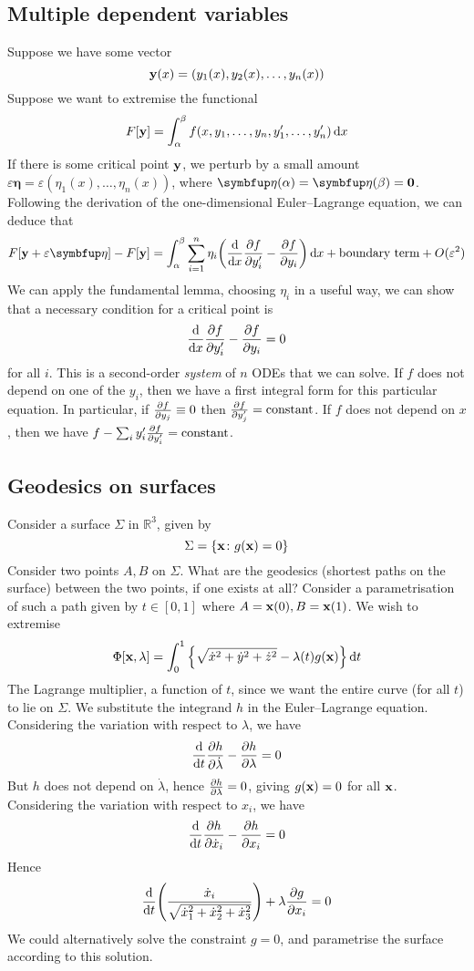 \subsection{Multiple dependent variables}
Suppose we have some vector
\[
	\vb y(x) = (y_1(x), y_2(x), \dots, y_n(x))
\]
Suppose we want to extremise the functional
\[
	F[\vb y] = \int_\alpha^\beta f(x, y_1, \dots, y_n, y'_1, \dots, y'_n) \dd{x}
\]
If there is some critical point \( \vb y \), we perturb by a small amount \( \varepsilon\bm \eta = \varepsilon(\eta_1(x), \dots, \eta_n(x)) \), where \( \bm\eta(\alpha) = \bm\eta(\beta) = \vb 0 \).
Following the derivation of the one-dimensional Euler--Lagrange equation, we can deduce that
\[
	F[\vb y + \varepsilon \bm \eta] - F[\vb y] = \int_\alpha^\beta \sum_{i=1}^n \eta_i \qty(\dv{x}\pdv{f}{y_i'} - \pdv{f}{y_i})\dd{x} + \text{boundary term} + O(\varepsilon^2)
\]
We can apply the fundamental lemma, choosing \( \eta_i \) in a useful way, we can show that a necessary condition for a critical point is
\[
	\dv{x}\pdv{f}{y_i'} - \pdv{f}{y_i} = 0
\]
for all \( i \).
This is a second-order \textit{system} of \( n \) ODEs that we can solve.
If \( f \) does not depend on one of the \( y_i \), then we have a first integral form for this particular equation.
In particular, if \( \pdv{f}{y_j} \equiv 0 \) then \( \pdv{f}{y_j'} = \text{constant} \).
If \( f \) does not depend on \( x \), then we have \( f - \sum_i y_i' \pdv{f}{y_i'} = \text{constant} \).

\subsection{Geodesics on surfaces}
Consider a surface \( \Sigma \) in \( \mathbb R^3 \), given by
\[
	\Sigma = \qty{ \vb x \colon g(\vb x) = 0 }
\]
Consider two points \( A, B \) on \( \Sigma \).
What are the geodesics (shortest paths on the surface) between the two points, if one exists at all?
Consider a parametrisation of such a path given by \( t \in [0, 1] \) where \( A = \vb x(0), B = \vb x(1) \).
We wish to extremise
\[
	\Phi[\vb x, \lambda] = \int_0^1 \qty{ \sqrt{\dot x^2 + \dot y^2 + \dot z^2} - \lambda(t) g(\vb x) } \dd{t}
\]
The Lagrange multiplier, a function of \( t \), since we want the entire curve (for all \( t \)) to lie on \( \Sigma \).
We substitute the integrand \( h \) in the Euler--Lagrange equation.
Considering the variation with respect to \( \lambda \), we have
\[
	\dv{t} \pdv{h}{\dot\lambda} - \pdv{h}{\lambda} = 0
\]
But \( h \) does not depend on \( \dot\lambda \), hence \( \pdv{h}{\lambda} = 0 \), giving \( g(\vb x) = 0 \) for all \( \vb x \).
Considering the variation with respect to \( x_i \), we have
\[
	\dv{t} \pdv{h}{\dot x_i} - \pdv{h}{x_i} = 0
\]
Hence
\[
	\dv{t}\qty(\frac{\dot x_i}{\sqrt{\dot x_1^2 + \dot x_2^2 + \dot x_3^2}}) + \lambda \pdv{g}{x_i} = 0
\]
We could alternatively solve the constraint \( g = 0 \), and parametrise the surface according to this solution.

